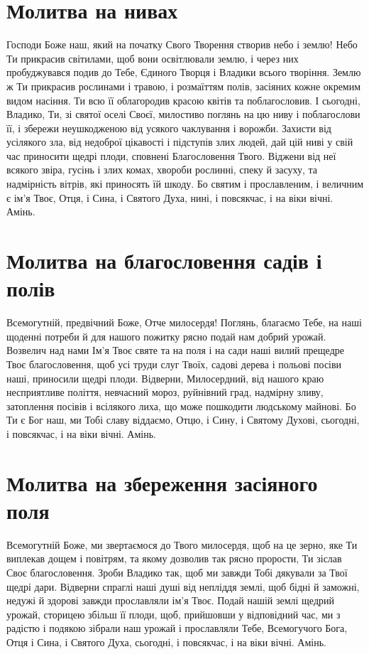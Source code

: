 \documentclass[chapters.tex]{subfiles}
\begin{document}
\section{Молитва на нивах}
Господи Боже наш, який на початку Свого Творення створив небо і землю! Небо Ти прикрасив світилами, щоб вони освітлювали землю, і через них пробуджувався подив до Тебе, Єдиного Творця і Владики всього творіння. Землю ж Ти прикрасив рослинами і травою, і розмаїттям полів, засіяних кожне окремим видом насіння. Ти всю її облагородив красою квітів та поблагословив. І сьогодні, Владико, Ти, зі святої оселі Своєї, милостиво поглянь на цю ниву і поблагослови її, і збережи неушкодженою від усякого чаклування і ворожби. Захисти від усілякого зла, від недоброї цікавості і підступів злих людей, дай цій ниві у свій час приносити щедрі плоди, сповнені Благословення Твого. Віджени від неї всякого звіра, гусінь і злих комах, хвороби рослинні, спеку й засуху, та надмірність вітрів, які приносять їй шкоду. Бо святим і прославленим, і величним є ім’я Твоє, Отця, і Сина, і Святого Духа, нині, і повсякчас, і на віки вічні. Амінь.

\section{Молитва на благословення садів і полів}
Всемогутній, предвічний Боже, Отче милосердя! Поглянь, благаємо Тебе, на наші щоденні потреби й для нашого пожитку рясно подай нам добрий урожай. Возвелич над нами Ім’я Твоє святе та на поля і на сади наші вилий прещедре Твоє благословення, щоб усі труди слуг Твоїх, садові дерева і польові посіви наші, приносили щедрі плоди. Відверни, Милосердний, від нашого краю несприятливе поліття, невчасний мороз, руйнівний град, надмірну зливу, затоплення посівів і всілякого лиха, що може пошкодити людському майнові. Бо Ти є Бог наш, ми Тобі славу віддаємо, Отцю, і Сину, і Святому Духові, сьогодні, і повсякчас, і на віки вічні. Амінь.

\section{Молитва на збереження засіяного поля}
Всемогутній Боже, ми звертаємося до Твого милосердя, щоб на це зерно, яке Ти виплекав дощем і повітрям, та якому дозволив так рясно прорости, Ти зіслав Своє благословення. Зроби Владико так, щоб ми завжди Тобі дякували за Твої щедрі дари. Відверни спраглі наші душі від непліддя землі, щоб бідні й заможні, недужі й здорові завжди прославляли ім’я Твоє. Подай нашій землі щедрий урожай, сторицею збільш її плоди, щоб, прийшовши у відповідний час, ми з радістю і подякою зібрали наш урожай і прославляли Тебе, Всемогучого Бога, Отця і Сина, і Святого Духа, сьогодні, і повсякчас, і на віки вічні. Амінь.
\end{document}
